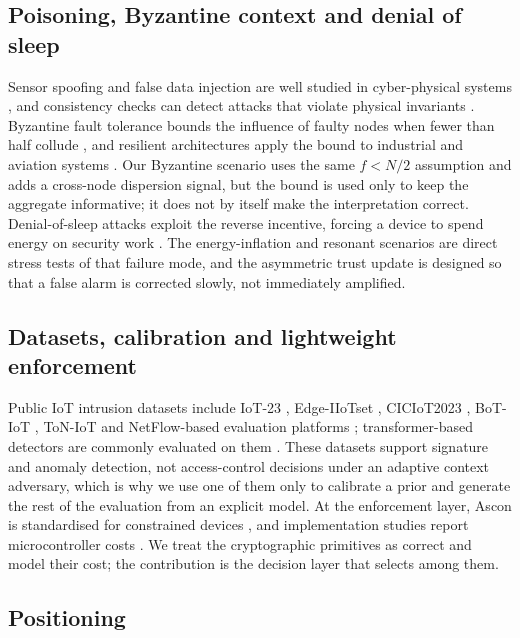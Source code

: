 \subsection{Poisoning, Byzantine context and denial of sleep}

Sensor spoofing and false data injection are well studied in cyber-physical
systems \cite{barua2020special,li2019optimal}, and consistency checks can detect
attacks that violate physical invariants \cite{ye2020summation}. Byzantine fault
tolerance bounds the influence of faulty nodes when fewer than half collude
\cite{lamport1982byzantine}, and resilient architectures apply the bound to
industrial and aviation systems \cite{alsulami2021resilient}. Our Byzantine
scenario uses the same $f<N/2$ assumption and adds a cross-node dispersion
signal, but the bound is used only to keep the aggregate informative; it does not
by itself make the interpretation correct. Denial-of-sleep attacks exploit the
reverse incentive, forcing a device to spend energy on security work
\cite{brownfield2005wireless,raymond2009effects}. The energy-inflation and
resonant scenarios are direct stress tests of that failure mode, and the
asymmetric trust update is designed so that a false alarm is corrected slowly, not
immediately amplified.

\subsection{Datasets, calibration and lightweight enforcement}

Public IoT intrusion datasets include IoT-23 \cite{garcia2020iot}, Edge-IIoTset
\cite{ferrag2022edge}, CICIoT2023 \cite{neto2023ciciot2023}, BoT-IoT
\cite{koroniotis2019development}, ToN-IoT \cite{moustafa2020data} and NetFlow-based
evaluation platforms \cite{moustafa2021new}; transformer-based detectors are
commonly evaluated on them \cite{tseng2024multi}. These datasets support
signature and anomaly detection, not access-control decisions under an adaptive
context adversary, which is why we use one of them only to calibrate a prior and
generate the rest of the evaluation from an explicit model. At the enforcement
layer, Ascon is standardised for constrained devices
\cite{dobraunig2021ascon}, and implementation studies report microcontroller
costs \cite{cagua2025implementation}. We treat the cryptographic primitives as
correct and model their cost; the contribution is the decision layer that
selects among them.

\subsection{Positioning}

